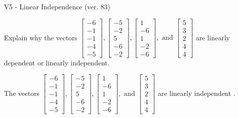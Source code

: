 \begin{exercise}
  \begin{exerciseTitle}V5 - Linear Independence (ver. 83)\end{exerciseTitle}
  \begin{exerciseStatement}
    Explain why the vectors \(\left[\begin{array}{r}
-6 \\
-1 \\
-1 \\
-4 \\
-5
\end{array}\right] , \left[\begin{array}{r}
-5 \\
-2 \\
5 \\
-6 \\
-2
\end{array}\right] , \left[\begin{array}{r}
1 \\
-6 \\
1 \\
-2 \\
-6
\end{array}\right] , \text{ and } \left[\begin{array}{r}
5 \\
3 \\
2 \\
4 \\
4
\end{array}\right]\) are linearly dependent or linearly independent.	


  \end{exerciseStatement}
  \begin{exerciseAnswer}
   The vectors \(\left[\begin{array}{r}
-6 \\
-1 \\
-1 \\
-4 \\
-5
\end{array}\right] , \left[\begin{array}{r}
-5 \\
-2 \\
5 \\
-6 \\
-2
\end{array}\right] , \left[\begin{array}{r}
1 \\
-6 \\
1 \\
-2 \\
-6
\end{array}\right] , \text{ and } \left[\begin{array}{r}
5 \\
3 \\
2 \\
4 \\
4
\end{array}\right]\) are 
  	 linearly independent  .
  


  \end{exerciseAnswer}
\end{exercise}
